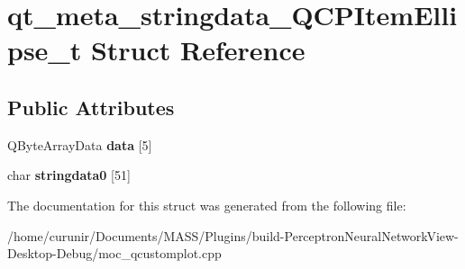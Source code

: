 \hypertarget{structqt__meta__stringdata___q_c_p_item_ellipse__t}{}\section{qt\+\_\+meta\+\_\+stringdata\+\_\+\+Q\+C\+P\+Item\+Ellipse\+\_\+t Struct Reference}
\label{structqt__meta__stringdata___q_c_p_item_ellipse__t}
\subsection*{Public Attributes}
\begin{DoxyCompactItemize}
\item 
Q\+Byte\+Array\+Data {\bfseries data} \mbox{[}5\mbox{]}\hypertarget{structqt__meta__stringdata___q_c_p_item_ellipse__t_ac8506617981990ea7d33afbc41f97fd2}{}\label{structqt__meta__stringdata___q_c_p_item_ellipse__t_ac8506617981990ea7d33afbc41f97fd2}

\item 
char {\bfseries stringdata0} \mbox{[}51\mbox{]}\hypertarget{structqt__meta__stringdata___q_c_p_item_ellipse__t_a47fd49f50069acd98fc8a4f2dec3672a}{}\label{structqt__meta__stringdata___q_c_p_item_ellipse__t_a47fd49f50069acd98fc8a4f2dec3672a}

\end{DoxyCompactItemize}


The documentation for this struct was generated from the following file\+:\begin{DoxyCompactItemize}
\item 
/home/curunir/\+Documents/\+M\+A\+S\+S/\+Plugins/build-\/\+Perceptron\+Neural\+Network\+View-\/\+Desktop-\/\+Debug/moc\+\_\+qcustomplot.\+cpp\end{DoxyCompactItemize}
